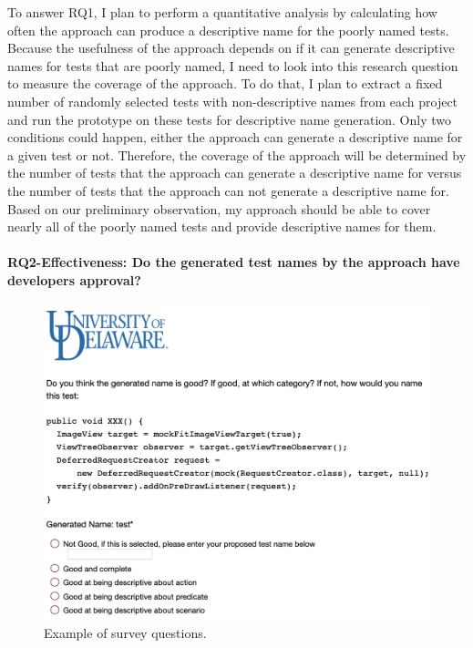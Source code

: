 To answer RQ1, I plan to perform a quantitative analysis by calculating how often the approach can produce a descriptive name for the poorly named tests.
%
Because the usefulness of the approach depends on if it can generate descriptive names for tests that are poorly named, I need to look into this research question to measure the coverage of the approach.
%
To do that, I plan to extract a fixed number of randomly selected tests with non-descriptive names from each project and run the prototype on these tests for descriptive name generation.
%
Only two conditions could happen, either the approach can generate a descriptive name for a given test or not.
%
Therefore, the coverage of the approach will be determined by the number of tests that the approach can generate a descriptive name for versus the number of tests that the approach can not generate a descriptive name for.
%
Based on our preliminary observation, my approach should be able to cover nearly all of the poorly named tests and provide descriptive names for them.


\paragraph{RQ2-Effectiveness: Do the generated test names by the approach have developers approval?}

\begin{figure}[t]
    \centering
    \includegraphics[scale=0.35]{figures/survey.png}
    \caption{Example of survey questions.}
    \label{fig:survey}
\end{figure}


